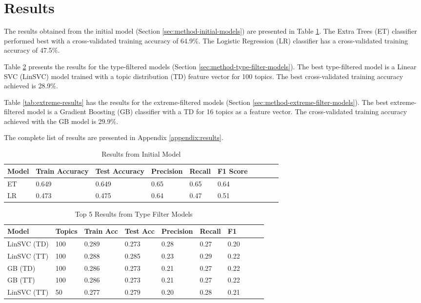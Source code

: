 \section{Results} \label{sec:results}

The results obtained from the initial model (Section \ref{sec:method-initial-models}) are presented in Table \ref{tab:initial-results}.
The Extra Trees (ET) classifier performed best with a cross-validated training accuracy of 64.9\%.
The Logistic Regression (LR) classifier has a cross-validated training accuracy of 47.5\%.

Table \ref{tab:filter-results} presents the results for the type-filtered models (Section \ref{sec:method-type-filter-models}).
The best type-filtered model is a Linear SVC (LinSVC) model trained with a topic distribution (TD) feature vector for 100 topics.
The best cross-validated training accuracy achieved is 28.9\%.

Table \ref{tab:extreme-results} has the results for the extreme-filtered models (Section \ref{sec:method-extreme-filter-models}).
The best extreme-filtered model is a Gradient Boosting (GB) classifier with a TD for 16 topics as a feature vector.
The cross-validated training accuracy achieved with the GB model is 29.9\%.

The complete list of results are presented in Appendix \ref{appendix:results}.
\begin{table}[!t]
    \centering
    \caption{Results from Initial Model}
    \label{tab:initial-results}
    \begin{tabular}{@{}llllllllll@{}}
    \toprule
    \rowcolor[HTML]{FFFFFF} 
    \textbf{Model} & \textbf{Train Accuracy} & \textbf{Test Accuracy} & \textbf{Precision} & \textbf{Recall} & \textbf{F1 Score} \\ \midrule
    ET & 0.649 & 0.649 & 0.65 & 0.65 & 0.64 \\
    LR & 0.473 & 0.475 & 0.64 & 0.47 & 0.51
\end{tabular}
\end{table}

\begin{table}[!t]
    \centering
    \caption{Top 5 Results from Type Filter Models}
    \label{tab:filter-results}
    \begin{tabular}{@{}llllllllll@{}}
    \toprule
    \rowcolor[HTML]{FFFFFF} 
    \textbf{Model} & \textbf{Topics} & \textbf{Train Acc} & \textbf{Test Acc} & \textbf{Precision} & \textbf{Recall} & \textbf{F1} \\ \midrule
    LinSVC (TD) & 100 & 0.289 & 0.273 & 0.28 & 0.27 & 0.20 \\
    LinSVC (TT) & 100 & 0.288 & 0.285 &	0.23 & 0.29	& 0.22 \\
    GB (TD)     & 100 & 0.286 &	0.273 &	0.21 & 0.27	& 0.22 \\
    GB (TT)     & 100 & 0.286 & 0.273 &	0.21 & 0.27 & 0.22 \\
    LinSVC (TT) & 50  & 0.277 & 0.279 & 0.20 & 0.28 & 0.21
\end{tabular}
\end{table}

